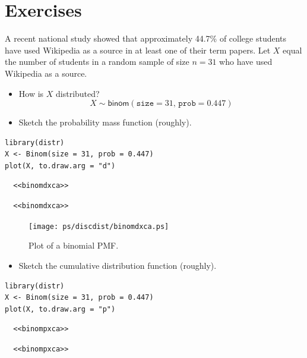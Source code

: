 \documentclass[captions=tableheading]{scrbook}
\begin{document}
\newpage{}
\section{Exercises}
\label{sec-5-8}

\setcounter{thm}{0}

\begin{xca}
A recent national study showed that approximately 44.7\% of college students have used Wikipedia as a source in at least one of their term papers. Let \(X\) equal the number of students in a random sample of size \(n=31\) who have used Wikipedia as a source. 
\begin{itemize}
\item How is \(X\) distributed? 
  \[
  X\sim\mathsf{binom}(\mathtt{size}=31,\,\mathtt{prob}=0.447)
  \]
\item Sketch the probability mass function (roughly).
\end{itemize}

\begin{verbatim}
library(distr)
X <- Binom(size = 31, prob = 0.447)
plot(X, to.draw.arg = "d")
\end{verbatim}


\begin{verbatim}
  <<binomdxca>>
\end{verbatim}


\begin{verbatim}
  <<binomdxca>>
\end{verbatim}

\begin{figure}[th]
  \texttt{[image: ps/discdist/binomdxca.ps]}
  \caption[Plot of a binomial PMF]{\small Plot of a binomial PMF.}
  \label{fig-binomdxca}
\end{figure}

\begin{itemize}
\item Sketch the cumulative distribution function (roughly).
\end{itemize}
   

\begin{verbatim}
library(distr)
X <- Binom(size = 31, prob = 0.447)
plot(X, to.draw.arg = "p")
\end{verbatim}


\begin{verbatim}
  <<binompxca>>
\end{verbatim}


\begin{verbatim}
  <<binompxca>>
\end{verbatim}


\end{xca}
\end{document}
